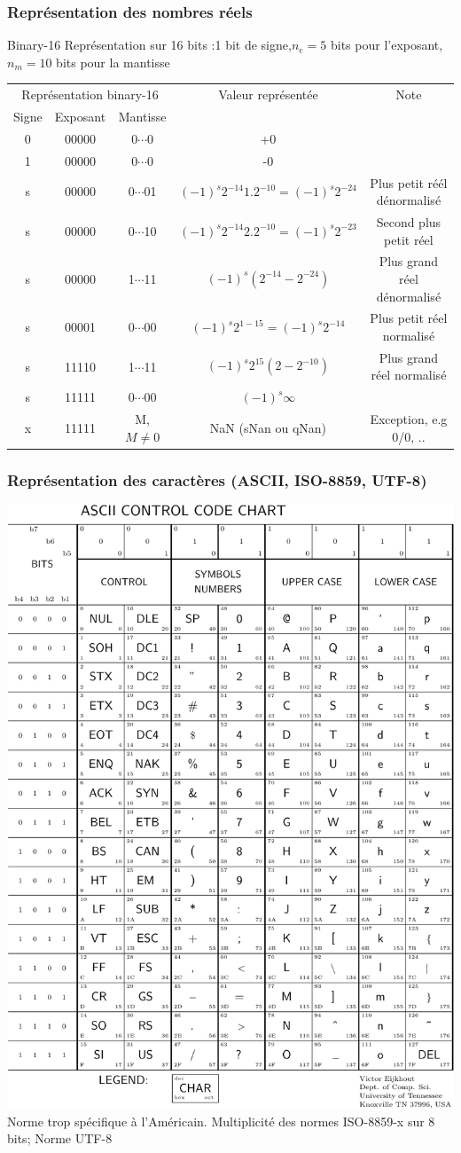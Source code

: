 \documentclass{beamer}
\begin{document}
\begin{frame}
  \frametitle{Représentation des nombres réels}
  \begin{block}{Binary-16}
    Représentation sur 16 bits :1 bit de signe,$n_e = 5$ bits pour l'exposant, $n_m=10$ bits pour la mantisse
    \begin{footnotesize}
    \begin{center}
\begin{tabular}{ccc|c|c}
\multicolumn{3}{c}{Représentation binary-16} & Valeur représentée & Note\\
Signe & Exposant & Mantisse & & \\
\hline\hline
0&00000&0$\cdots$0 & +0 & \\
1&00000&0$\cdots$0 & -0 & \\
s&00000&0$\cdots$01 & $(-1)^s 2^{-14} 1.2^{-10} = (-1)^s 2^{-24}$ & Plus petit réél dénormalisé\\
s&00000&0$\cdots$10 & $(-1)^s 2^{-14} 2.2^{-10} = (-1)^s 2^{-23}$ & Second plus petit réel\\
s&00000&1$\cdots$11 & $(-1)^s (2^{-14} - 2^{-24})$ & Plus grand réel dénormalisé\\
s&00001&0$\cdots$00 & $(-1)^s 2^{1-15} = (-1)^s 2^{-14}$ & Plus petit réel normalisé \\
s&11110&1$\cdots$11 & $(-1)^s 2^{15} (2 - 2^{-10})$& Plus grand réel normalisé \\
s&11111&0$\cdots$00 & $(-1)^s \infty$ & \\
x&11111& M, $M \neq 0$ & NaN (sNan ou qNan) & Exception, e.g 0/0, ..
\end{tabular}
    \end{center}
    \end{footnotesize}
  \end{block}
\end{frame}


\begin{frame}
\frametitle{Représentation des caractères (ASCII, ISO-8859, UTF-8)}
\includegraphics[width=0.35\linewidth]{Figs/ascii_table.pdf}
Norme trop spécifique à l'Américain. Multiplicité des normes ISO-8859-x sur 8 bits; Norme UTF-8

\end{frame}
\end{document}
